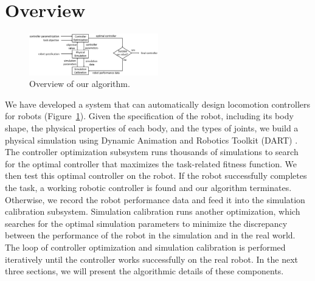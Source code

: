 \section{Overview}

\begin{figure}[!t]
  \centering
  \includegraphics[width=0.5\textwidth]{figures/controllerTransfer}
  \caption{Overview of our algorithm.}
  \label{fig:controllerTransferOverview}
\end{figure}

We have developed a system that can automatically design locomotion controllers for robots (Figure~\ref{fig:controllerTransferOverview}). Given the specification of the robot, including its body shape, the physical properties of each body, and the types of joints, we build a physical simulation using Dynamic Animation and Robotics Toolkit (DART) \cite{dart:2012}. The controller optimization subsystem runs thousands of simulations to search for the optimal controller that maximizes the task-related fitness function. We then test this optimal controller on the robot. If the robot successfully completes the task, a working robotic controller is found and our algorithm terminates. Otherwise, we record the robot performance data and feed it into the simulation calibration subsystem. Simulation calibration runs another optimization, which searches for the optimal simulation parameters to minimize the discrepancy between the performance of the robot in the simulation and in the real world. The loop of controller optimization and simulation calibration is performed iteratively until the controller works successfully on the real robot. In the next three sections, we will present the algorithmic details of these components.
